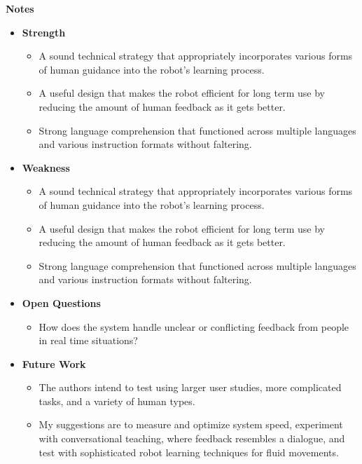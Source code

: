 \documentclass[report.tex]{subfiles}
\begin{document}
\noindent\textbf{Notes}
\begin{itemize}
    \item \noindent\textbf {Strength}
    \begin{itemize}
        \item A sound technical strategy that appropriately incorporates various forms of human guidance into the robot's learning process. 
     
       
        \item A useful design that makes the robot efficient for long term use by reducing the amount of human feedback as it gets better. 
        \item Strong language comprehension that functioned across multiple languages and various instruction formats without faltering.
    \end{itemize}
    
    \item \noindent\textbf{Weakness}
    \begin{itemize}
        \item A sound technical strategy that appropriately incorporates various forms of human guidance into the robot's learning process. 
     
    
        \item A useful design that makes the robot efficient for long term use by reducing the amount of human feedback as it gets better. 
        \item Strong language comprehension that functioned across multiple languages and various instruction formats without faltering. 
    \end{itemize}
\end{itemize}

\begin{itemize}
    \item \noindent\textbf {Open Questions}
    \begin{itemize}
        \item   How does the system handle unclear or conflicting feedback from people in real time situations? 

    \end{itemize}
    
    \item \noindent\textbf{Future Work}
    \begin{itemize}
        \item  The authors intend to test using larger user studies, more complicated tasks, and a variety of human types. 
     
        \item My suggestions are to measure and optimize system speed, experiment with conversational teaching, where feedback resembles a dialogue, and test with sophisticated robot learning techniques for fluid movements. 
        
    \end{itemize}
\end{itemize}
\end{document}
